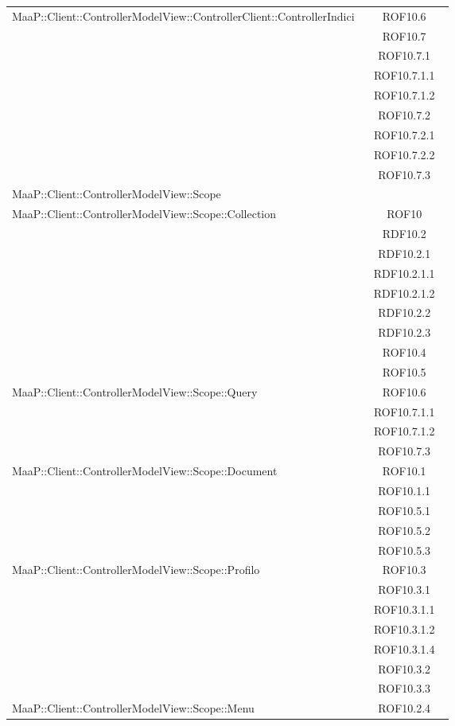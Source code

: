 \begin{center}
\begin{longtable}{|p{0.8\linewidth}|c|}
\midrule
MaaP::Client::ControllerModelView::ControllerClient::ControllerIndici
& ROF10.6\\
& ROF10.7\\
& ROF10.7.1\\
& ROF10.7.1.1\\
& ROF10.7.1.2\\
& ROF10.7.2\\
& ROF10.7.2.1\\
& ROF10.7.2.2\\
& ROF10.7.3\\


\midrule
MaaP::Client::ControllerModelView::Scope
& \\

\midrule
MaaP::Client::ControllerModelView::Scope::Collection
& ROF10\\
& RDF10.2\\
& RDF10.2.1\\
& RDF10.2.1.1\\
& RDF10.2.1.2\\
& RDF10.2.2\\
& RDF10.2.3\\
& ROF10.4\\
& ROF10.5\\

\midrule
MaaP::Client::ControllerModelView::Scope::Query
& ROF10.6\\
& ROF10.7.1.1\\
& ROF10.7.1.2\\
& ROF10.7.3\\

\midrule
MaaP::Client::ControllerModelView::Scope::Document
& ROF10.1\\
& ROF10.1.1\\
& ROF10.5.1\\
& ROF10.5.2\\
& ROF10.5.3\\


\midrule
MaaP::Client::ControllerModelView::Scope::Profilo
& ROF10.3\\
& ROF10.3.1\\
& ROF10.3.1.1\\
& ROF10.3.1.2\\
& ROF10.3.1.4\\
& ROF10.3.2\\
& ROF10.3.3\\


\midrule
MaaP::Client::ControllerModelView::Scope::Menu
& ROF10.2.4\\


\end{longtable}
\end{center}
